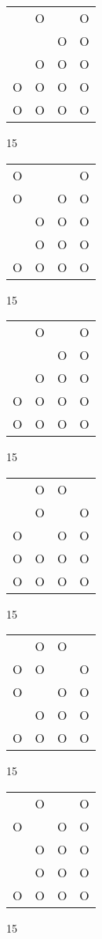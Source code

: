\begin{tabular}{|m{0.2cm}m{0.2cm}m{0.2cm}m{0.2cm}|}\hline
 &O& &O\\
 & &O&O\\
 &O&O&O\\
O&O&O&O\\
O&O&O&O\\
\hline\end{tabular}15
\begin{tabular}{|m{0.2cm}m{0.2cm}m{0.2cm}m{0.2cm}|}\hline
O& & &O\\
O& &O&O\\
 &O&O&O\\
 &O&O&O\\
O&O&O&O\\
\hline\end{tabular}15
\begin{tabular}{|m{0.2cm}m{0.2cm}m{0.2cm}m{0.2cm}|}\hline
 &O& &O\\
 & &O&O\\
 &O&O&O\\
O&O&O&O\\
O&O&O&O\\
\hline\end{tabular}15
\begin{tabular}{|m{0.2cm}m{0.2cm}m{0.2cm}m{0.2cm}|}\hline
 &O&O& \\
 &O& &O\\
O& &O&O\\
O&O&O&O\\
O&O&O&O\\
\hline\end{tabular}15
\begin{tabular}{|m{0.2cm}m{0.2cm}m{0.2cm}m{0.2cm}|}\hline
 &O&O& \\
O&O& &O\\
O& &O&O\\
 &O&O&O\\
O&O&O&O\\
\hline\end{tabular}15
\begin{tabular}{|m{0.2cm}m{0.2cm}m{0.2cm}m{0.2cm}|}\hline
 &O& &O\\
O& &O&O\\
 &O&O&O\\
 &O&O&O\\
O&O&O&O\\
\hline\end{tabular}15

